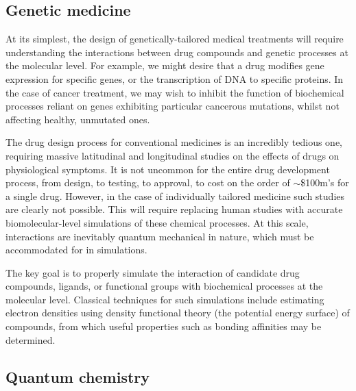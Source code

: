 %
%

\subsection{Genetic medicine}

At its simplest, the design of genetically-tailored medical treatments will require understanding the interactions between drug compounds and genetic processes at the molecular level. For example, we might desire that a drug modifies gene expression for specific genes, or the transcription of DNA to specific proteins. In the case of cancer treatment, we may wish to inhibit the function of biochemical processes reliant on genes exhibiting particular cancerous mutations, whilst not affecting healthy, unmutated ones.

The drug design process for conventional medicines is an incredibly tedious one, requiring massive latitudinal and longitudinal studies on the effects of drugs on physiological symptoms. It is not uncommon for the entire drug development process, from design, to testing, to approval, to cost on the order of $\sim$\$100m's for a single drug. However, in the case of individually tailored medicine such studies are clearly not possible. This will require replacing human studies with accurate biomolecular-level simulations of these chemical processes. At this scale, interactions are inevitably quantum mechanical in nature, which must be accommodated for in simulations.

The key goal is to properly simulate the interaction of candidate drug compounds, ligands, or functional groups with biochemical processes at the molecular level. Classical techniques for such simulations include estimating electron densities using density functional theory (the potential energy surface) of compounds, from which useful properties such as bonding affinities may be determined.

%
%

\subsection{Quantum chemistry}

